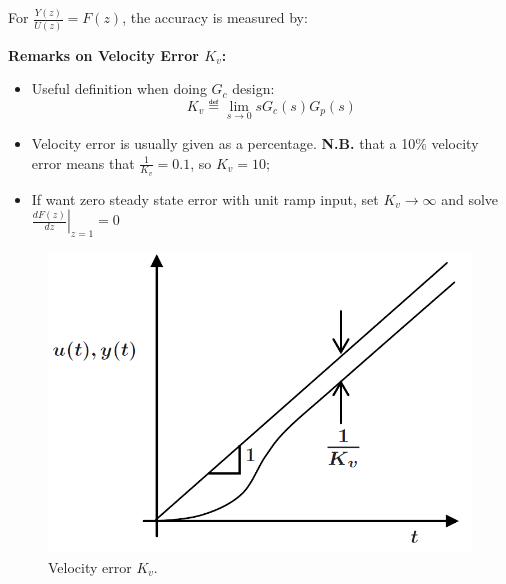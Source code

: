 For $\frac{Y(z)}{U(z)}=F(z)$, the accuracy is measured by:
\begin{table}[H]
\centering
\renewcommand{\arraystretch}{2}
\end{table}

\textbf{Remarks on Velocity Error $K_v$:}

\begin{itemize}
    \item Useful definition when doing $G_c$ design: 
    \begin{equation*}
        K_v\eqdef \lim_{s\to 0} s G_c(s) G_p(s)
    \end{equation*}
    \item Velocity error is usually given as a percentage. \textbf{N.B.} that a 10\% velocity error means that $\frac{1}{K_v}=0.1$, so $K_v = 10$;
    \item If want zero steady state error with unit ramp input, set $K_v \to \infty$ and solve $\left.\frac{dF(z)}{dz}\right|_{z=1} = 0$
\end{itemize}

\begin{figure}[H]
    \centering
    \includegraphics[width=0.75\linewidth]{images/K_v_constant.png}
    \captionsetup{justification=centering}
    \caption{Velocity error $K_v$.}
\end{figure}